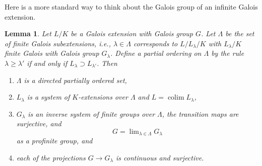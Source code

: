 \documentclass{stacks-project}
\theoremstyle{plain}
\newtheorem{lemma}[subsection]{Lemma}
\theoremstyle{definition}
\theoremstyle{remark}
\numberwithin{equation}{subsection}
\def\lim{\mathop{\mathrm{lim}}\nolimits}
\def\colim{\mathop{\mathrm{colim}}\nolimits}
\begin{document}
\noindent
Here is a more standard way to think about
the Galois group of an infinite Galois extension.

\begin{lemma}
\label{lemma-infinite-galois-limit}
Let $L/K$ be a Galois extension with Galois group $G$.
Let $\Lambda$ be the set of finite Galois subextensions,
i.e., $\lambda \in \Lambda$ corresponds to $L/L_\lambda/K$
with $L_\lambda/K$ finite Galois with Galois group $G_\lambda$.
Define a partial ordering on $\Lambda$ by the rule
$\lambda \geq \lambda'$ if and only if
$L_\lambda \supset L_{\lambda'}$. Then
\begin{enumerate}
\item $\Lambda$ is a directed partially ordered set,
\item $L_\lambda$ is a system of $K$-extensions over $\Lambda$
and $L = \colim L_\lambda$,
\item $G_\lambda$ is an inverse system of finite groups over $\Lambda$,
the transition maps are surjective, and
$$
G = \lim_{\lambda \in \Lambda} G_\lambda
$$
as a profinite group, and
\item each of the projections $G \to G_\lambda$ is continuous and surjective.
\end{enumerate}
\end{lemma}
\end{document}
